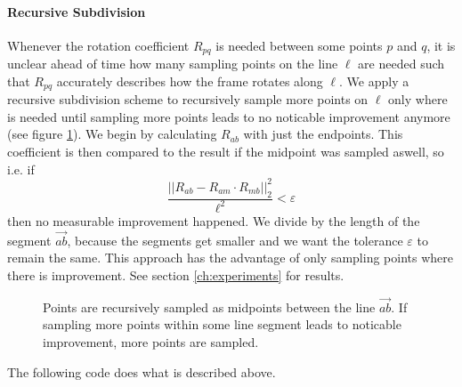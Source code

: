\documentclass[../thesis.tex]{subfiles}
\begin{document}
\paragraph*{Recursive Subdivision}
Whenever the rotation coefficient $R_{pq}$ is needed between some points $p$ and $q$,
it is unclear ahead of time how many sampling points on the line $\ell$
are needed such that $R_{pq}$ accurately describes how the frame rotates along $\ell$.
We apply a recursive subdivision scheme to recursively sample more points on $\ell$ only where is needed
until sampling more points leads to no noticable improvement anymore (see figure \ref{fig:recursiveSubdivision}).
We begin by calculating $R_{ab}$ with just the endpoints. This coefficient is then compared to the result if the midpoint was sampled aswell,
so i.e. if
$$\frac{||R_{ab} - R_{am}\cdot R_{mb}||^2_2}{\ell^2}< \varepsilon$$
then no measurable improvement happened. We divide by the length of the segment $\vec{ab}$, because the segments get smaller
and we want the tolerance $\varepsilon$ to remain the same.
This approach has the advantage of only sampling points where there is improvement.
See section \ref{ch:experiments} for results.
\begin{figure}[htb]
  \centering
  \def\svgwidth{20em}
  
  \caption{Points are recursively sampled as midpoints between the line $\vec{ab}$.
  If sampling more points within some line segment leads to noticable improvement, more points are sampled.}
  \label{fig:recursiveSubdivision}
\end{figure}

The following code does what is described above.
\end{document}
